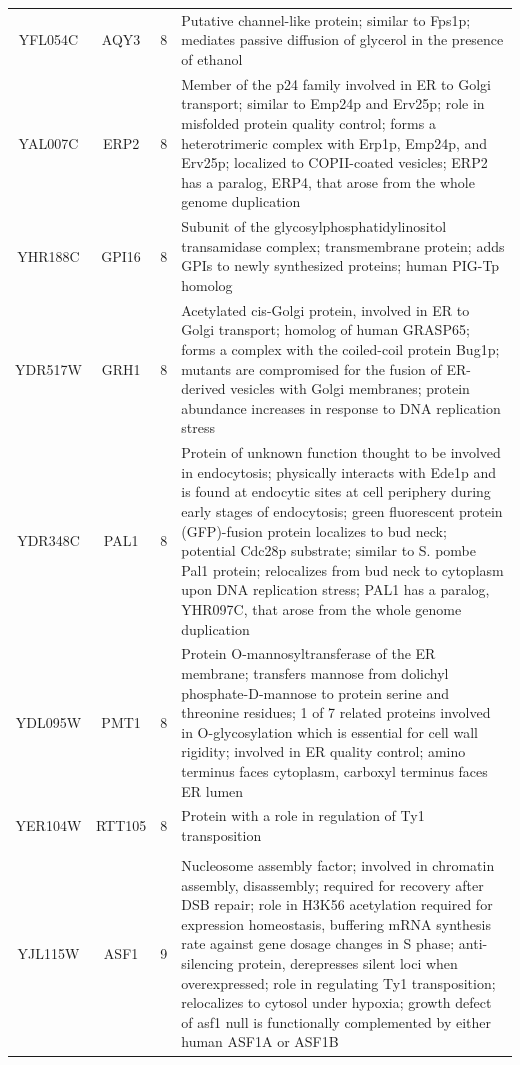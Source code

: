\documentclass[]{article}
\begin{document}
\begin{longtable}{@{\extracolsep{3pt}} cccp{85mm}}
YFL054C & AQY3 & 8 & Putative channel-like protein; similar to Fps1p; mediates passive diffusion of glycerol in the presence of ethanol \\ 
YAL007C & ERP2 & 8 & Member of the p24 family involved in ER to Golgi transport; similar to Emp24p and Erv25p; role in misfolded protein quality control; forms a heterotrimeric complex with Erp1p, Emp24p, and Erv25p; localized to COPII-coated vesicles; ERP2 has a paralog, ERP4, that arose from the whole genome duplication \\ 
YHR188C & GPI16 & 8 & Subunit of the glycosylphosphatidylinositol transamidase complex; transmembrane protein; adds GPIs to newly synthesized proteins; human PIG-Tp homolog \\ 
YDR517W & GRH1 & 8 & Acetylated cis-Golgi protein, involved in ER to Golgi transport; homolog of human GRASP65; forms a complex with the coiled-coil protein Bug1p; mutants are compromised for the fusion of ER-derived vesicles with Golgi membranes; protein abundance increases in response to DNA replication stress \\ 
YDR348C & PAL1 & 8 & Protein of unknown function thought to be involved in endocytosis; physically interacts with Ede1p and is found at endocytic sites at cell periphery during early stages of endocytosis; green fluorescent protein (GFP)-fusion protein localizes to bud neck; potential Cdc28p substrate; similar to S. pombe Pal1 protein; relocalizes from bud neck to cytoplasm upon DNA replication stress; PAL1 has a paralog, YHR097C, that arose from the whole genome duplication \\ 
YDL095W & PMT1 & 8 & Protein O-mannosyltransferase of the ER membrane; transfers mannose from dolichyl phosphate-D-mannose to protein serine and threonine residues; 1 of 7 related proteins involved in O-glycosylation which is essential for cell wall rigidity; involved in ER quality control; amino terminus faces cytoplasm, carboxyl terminus faces ER lumen \\ 
YER104W & RTT105 & 8 & Protein with a role in regulation of Ty1 transposition \\   \hline \\ [-1.8ex] 
YJL115W & ASF1 & 9 & Nucleosome assembly factor; involved in chromatin assembly, disassembly; required for recovery after DSB repair; role in H3K56 acetylation required for expression homeostasis, buffering mRNA synthesis rate against gene dosage changes in S phase; anti-silencing protein, derepresses silent loci when overexpressed; role in regulating Ty1 transposition; relocalizes to cytosol under hypoxia; growth defect of asf1 null is functionally complemented by either human ASF1A or ASF1B \\ 

\end{longtable}
\end{document}
